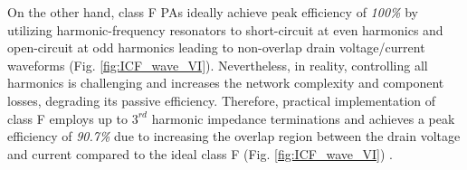 \documentclass[conference]{IEEEtran}
\begin{document}
On the other hand, class F PAs ideally achieve peak efficiency of \textit{100\%} by utilizing harmonic-frequency resonators \color{blue} to short-circuit \color{black} at even harmonics and open-circuit at odd harmonics \color{blue} leading to non-overlap drain voltage/current waveforms (Fig. \ref{fig:ICF_wave_VI}). Nevertheless, in reality,  \color{black} controlling all \color{blue} harmonics is challenging and increases the network complexity and component losses, degrading its passive efficiency. \color{black} Therefore, practical implementation of class F \color{blue} employs \color{black} up to $3^{rd}$ harmonic \color{blue} impedance terminations and \color{black}  achieves \color{blue} a \color{black} peak efficiency of \textit{90.7\%} due to \color{blue} increasing the overlap region between the drain voltage and current \color{black} compared to \color{blue} the \color{black} ideal class F (Fig. \ref{fig:ICF_wave_VI}) \cite{Raab_max_eff}.
\end{document}
